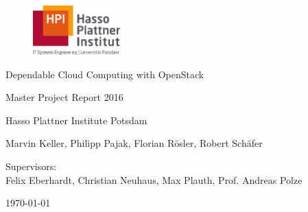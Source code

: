 \begin{titlepage}
  \begin{center} 
    \mbox{}
    \vspace{1cm}
		
		\begin{figure}[h]
			\centering
				\includegraphics[width=0.30\textwidth]{images/HPILogo.pdf}
			\label{fig:hpi_logo}
		\end{figure}
		
		\vspace{1cm}
		
		{\Large Dependable Cloud Computing with OpenStack}\\
	
		\vspace{1cm}
		
		{\Huge Master Project Report 2016}  
		
		\vspace{1cm}
		
		{\Large Hasso Plattner Institute Potsdam}
    
    \vspace{2.5cm}

    \vspace{1em}
    
		{\large Marvin Keller, Philipp Pajak, Florian Rösler, Robert Schäfer}\\
		
		\vspace{1cm}
		
		Supervisors:\\
		\vspace{1em}
		{\large Felix Eberhardt, Christian Neuhaus, Max Plauth, Prof. Andreas Polze}\\
		
    \vspace{4em}
    
    \today
  \end{center}
\end{titlepage}
